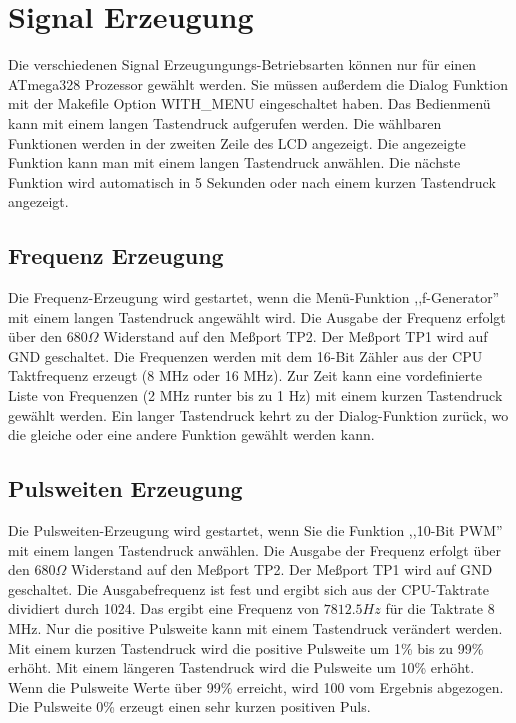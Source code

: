 \chapter{Signal Erzeugung}

Die verschiedenen Signal Erzeugungungs-Betriebsarten können nur für einen ATmega328 Prozessor
gewählt werden.
Sie müssen außerdem die Dialog Funktion mit der Makefile Option WITH\_MENU eingeschaltet haben.
Das Bedienmenü kann mit einem langen Tastendruck aufgerufen werden.
Die wählbaren Funktionen werden in der zweiten Zeile des LCD angezeigt.
Die angezeigte Funktion kann man mit einem langen Tastendruck anwählen.
Die nächste Funktion wird automatisch in 5 Sekunden oder nach einem kurzen Tastendruck
angezeigt.

\label{sec:generation}

\section{Frequenz Erzeugung}
Die Frequenz-Erzeugung wird gestartet, wenn die Menü-Funktion ,,f-Generator'' mit einem
langen Tastendruck angewählt wird.
Die Ausgabe der Frequenz erfolgt über den \(680\Omega\) Widerstand auf den Meßport TP2.
Der Meßport TP1 wird auf GND geschaltet.
Die Frequenzen werden mit dem 16-Bit Zähler aus der CPU Taktfrequenz erzeugt (8 MHz oder 16 MHz).
Zur Zeit kann eine vordefinierte Liste von Frequenzen (2 MHz runter bis zu 1 Hz) mit einem kurzen
Tastendruck gewählt werden. Ein langer Tastendruck kehrt zu der Dialog-Funktion zurück,
wo die gleiche oder eine andere Funktion gewählt werden kann.

\section{Pulsweiten Erzeugung}
Die Pulsweiten-Erzeugung wird gestartet, wenn Sie die Funktion ,,10-Bit PWM'' mit einem
langen Tastendruck anwählen.
Die Ausgabe der Frequenz erfolgt über den \(680\Omega\) Widerstand auf den Meßport TP2.
Der Meßport TP1 wird auf GND geschaltet.
Die Ausgabefrequenz ist fest und ergibt sich aus der CPU-Taktrate dividiert durch 1024.
Das ergibt eine Frequenz von \(7812.5 Hz\) für die Taktrate 8 MHz.
Nur die positive Pulsweite kann mit einem Tastendruck verändert werden. Mit einem
kurzen Tastendruck wird die positive Pulsweite um 1\% bis zu 99\% erhöht.
Mit einem längeren Tastendruck wird die Pulsweite um 10\% erhöht.
Wenn die Pulsweite Werte über 99\% erreicht, wird 100 vom Ergebnis abgezogen.
Die Pulsweite 0\% erzeugt einen sehr kurzen positiven Puls.

